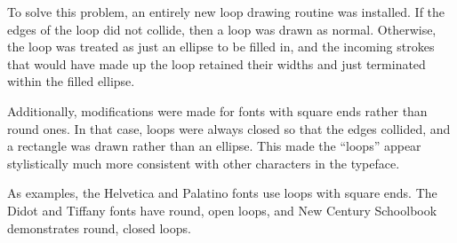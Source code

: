 To solve this problem, an entirely new loop drawing routine was installed. If
the edges of the loop did not collide, then a loop was drawn as normal.
Otherwise, the loop was treated as just an ellipse to be filled in, and the
incoming strokes that would have made up the loop retained their widths and just
terminated within the filled ellipse.

Additionally, modifications were made for fonts with square ends rather than
round ones. In that case, loops were always closed so that the edges collided,
and a rectangle was drawn rather than an ellipse. This made the ``loops'' appear
stylistically much more consistent with other characters in the typeface.

As examples, the Helvetica and Palatino fonts use loops with square ends. The
Didot and Tiffany fonts have round, open loops, and New Century Schoolbook
demonstrates round, closed loops.

